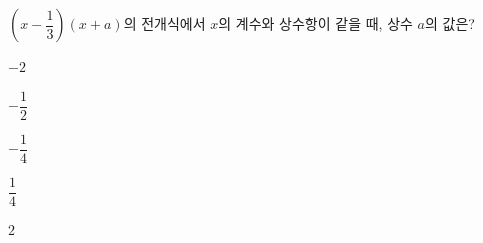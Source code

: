 $\left(x-\dfrac{1}{3}\right)(x+a)$의 전개식에서 $x$의 계수와 상수항이 같을 때, 상수 $a$의 값은?
\begin{choices32}{\rule[-3ex]{0pt}{8ex}$-2$}{\rule[-3ex]{0pt}{8ex}$-\dfrac{1}{2}$}{\rule[-3ex]{0pt}{8ex}$-\dfrac{1}{4}$}{\rule[-3ex]{0pt}{8ex}$\dfrac{1}{4}$}{\rule[-3ex]{0pt}{8ex}$2$}\end{choices32}
